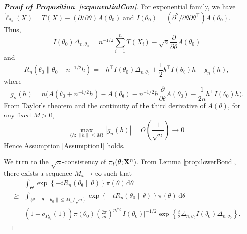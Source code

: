 \documentclass[11pt]{article}
\theoremstyle{plain}
\theoremstyle{definition}
\theoremstyle{remark}
\begin{document}
\begin{appendices}
\begin{proof}[\textbf{Proof of Proposition~\ref{exponentialCon}}]
    For exponential family, we have $\dot{\ell}_{\theta_0} (X) = T(X) - ( \partial / \partial \theta ) A(\theta_0)$ and $I(\theta_0) = (\partial^2 /\partial \theta \partial \theta^\top ) A(\theta_0)$.
    Thus,
    $$
    I(\theta_0)\Delta_{n,\theta_0}=n^{-1/2}\sum_{i=1}^n T(X_i)-\sqrt{n}\frac{\partial}{\partial \theta} A(\theta_0)
    $$
    and
    $$
    R_n ( \theta_0 \| \theta_0 + n^{-1/2}h  )
    =-h^\top  I(\theta_0) \Delta_{n,\theta_0}+\frac{1}{2} h^\top  I(\theta_0) h +
    g_n(h),
    $$
    where
    $$
    g_n(h)=n\Big(A(\theta_0+n^{-1/2}h)-A(\theta_0)-n^{-1/2}h \frac{\partial}{\partial \theta}A(\theta_0)-\frac{1}{2n}h^\top  I(\theta_0) h\Big).
    $$
    From Taylor's theorem and the continuity of the third derivative of $A(\theta)$, 
    for any fixed $M>0$,
    $$
        \max_{\{h:\|h\|\leq M\}}|g_n(h)|=O\left(\frac{1}{\sqrt{n}}\right)\to 0.
    $$
    Hence Assumption \ref{Assumption1} holds.

    We turn to the $\sqrt n$-consistency of $\pi_t(\theta; \mathbf{X}^n)$.
    From Lemma \ref{prop:lowerBoud},
    there exists a sequence $M_n \to \infty$ such that
    \begin{equation}\label{yaotou1}
    \begin{split}
&
    \int_{\Theta} \exp\left\{ -t R_n (\theta_0 \| \theta) \right\} \pi(\theta) \, \mathrm d \theta
    \\
    \geq &
    \int_{\{\theta:\|\theta-\theta_0\|\leq M_n/\sqrt{n}\}}
\exp\left\{ -t R_n (\theta_0 \| \theta) \right\}
     \pi(\theta)\, \mathrm d\theta
    \\
    =&
    (1+o_{P^n_{\theta_0}}(1))
        \pi(\theta_0)
    \left(\frac{2\pi}{t n}\right)^{p/2} |I(\theta_0)|^{-1/2}
    \exp\left\{ \frac{t}{2}\Delta_{n,\theta_0}^\top  I(\theta_0)\Delta_{n,\theta_0} \right\}
    .
    \end{split}
\end{equation}


\end{proof}
\end{appendices}
\end{document}
